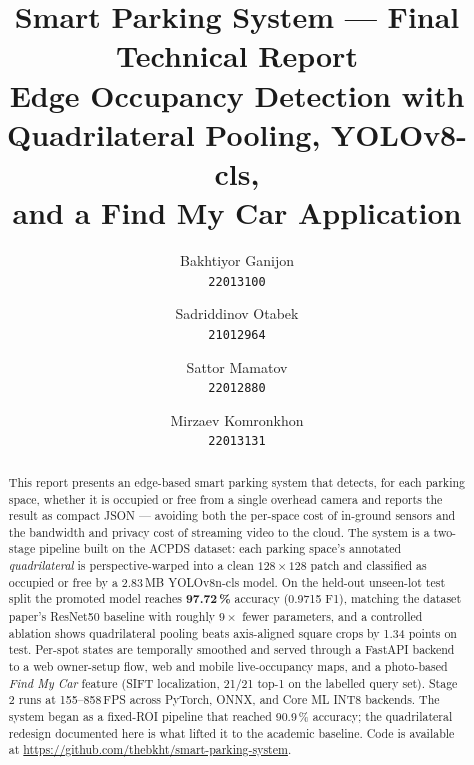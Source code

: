 \documentclass[10pt,twocolumn,letterpaper]{article}
\begin{document}
\title{\vspace{-2ex}Smart Parking System --- Final Technical Report\\
Edge Occupancy Detection with Quadrilateral Pooling, YOLOv8-cls,\\
and a Find My Car Application}

\author{Bakhtiyor Ganijon\\
{\tt\small 22013100}
\and
{Sadriddinov Otabek}\\
{\tt\small 21012964}
\and
{Sattor Mamatov}\\
{\tt\small 22012880}
\and
{Mirzaev Komronkhon}\\
{\tt\small 22013131}
}

\maketitle

\raggedbottom

\begin{abstract}
\noindent
This report presents an edge-based smart parking system that detects, for
each parking space, whether it is occupied or free from a single overhead
camera and reports the result as compact JSON --- avoiding both the
per-space cost of in-ground sensors and the bandwidth and privacy cost of
streaming video to the cloud. The system is a two-stage pipeline built on
the ACPDS dataset: each parking space's annotated \emph{quadrilateral} is
perspective-warped into a clean $128\times128$ patch and classified as
occupied or free by a 2.83\,MB YOLOv8n-cls model. On the held-out
unseen-lot test split the promoted model reaches \textbf{97.72\,\%}
accuracy (0.9715 F1), matching the dataset paper's ResNet50 baseline with
roughly $9\times$ fewer parameters, and a controlled ablation shows
quadrilateral pooling beats axis-aligned square crops by 1.34 points on
test. Per-spot states are temporally smoothed and served through a FastAPI
backend to a web owner-setup flow, web and mobile live-occupancy maps, and
a photo-based \emph{Find My Car} feature (SIFT localization, 21/21 top-1
on the labelled query set). Stage 2 runs at 155--858\,FPS across
PyTorch, ONNX, and Core ML INT8 backends. The system began as a fixed-ROI
pipeline that reached 90.9\,\% accuracy; the quadrilateral redesign
documented here is what lifted it to the academic baseline. Code is
available at \url{https://github.com/thebkht/smart-parking-system}.
\end{abstract}
\end{document}
